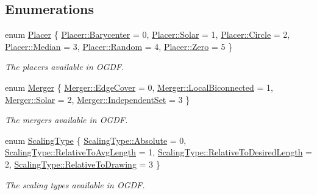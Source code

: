 \subsection*{Enumerations}
\begin{DoxyCompactItemize}
\item 
enum \hyperlink{layout_8hh_a93e50260439be3f5fe75b271c0ce2c96}{Placer} \{ \newline
\hyperlink{layout_8hh_a93e50260439be3f5fe75b271c0ce2c96abbbb1a06b3b22c3ccc5648b57aef0e87}{Placer\+::\+Barycenter} = 0, 
\hyperlink{layout_8hh_a93e50260439be3f5fe75b271c0ce2c96a352ccd39c4ed093da3690db82cca8ca0}{Placer\+::\+Solar} = 1, 
\hyperlink{layout_8hh_a93e50260439be3f5fe75b271c0ce2c96a30954d90085f6eaaf5817917fc5fecb3}{Placer\+::\+Circle} = 2, 
\hyperlink{layout_8hh_a93e50260439be3f5fe75b271c0ce2c96a66851a3adec6655a7bd563743e4a55a2}{Placer\+::\+Median} = 3, 
\newline
\hyperlink{layout_8hh_a93e50260439be3f5fe75b271c0ce2c96a64663f4646781c9c0110838b905daa23}{Placer\+::\+Random} = 4, 
\hyperlink{layout_8hh_a93e50260439be3f5fe75b271c0ce2c96ad7ed4ee1df437474d005188535f74875}{Placer\+::\+Zero} = 5
 \}\begin{DoxyCompactList}\small\item\em The placers available in O\+G\+DF. \end{DoxyCompactList}
\item 
enum \hyperlink{layout_8hh_a87e3986b1a6733e81a1c0b4bbd6aba18}{Merger} \{ \hyperlink{layout_8hh_a87e3986b1a6733e81a1c0b4bbd6aba18a63dbd8d091f1e5944a41cf67c314cbd5}{Merger\+::\+Edge\+Cover} = 0, 
\hyperlink{layout_8hh_a87e3986b1a6733e81a1c0b4bbd6aba18a18f7761401e380de1934a428c869b056}{Merger\+::\+Local\+Biconnected} = 1, 
\hyperlink{layout_8hh_a87e3986b1a6733e81a1c0b4bbd6aba18a352ccd39c4ed093da3690db82cca8ca0}{Merger\+::\+Solar} = 2, 
\hyperlink{layout_8hh_a87e3986b1a6733e81a1c0b4bbd6aba18a8b4d6dc43f32b455d6f6aeb880d12e0e}{Merger\+::\+Independent\+Set} = 3
 \}\begin{DoxyCompactList}\small\item\em The mergers available in O\+G\+DF. \end{DoxyCompactList}
\item 
enum \hyperlink{layout_8hh_ae327227c361ab0e868a1f25017cb3ae2}{Scaling\+Type} \{ \hyperlink{layout_8hh_ae327227c361ab0e868a1f25017cb3ae2ab51ca26c6c89cfc9bec338f7a0d3e0c8}{Scaling\+Type\+::\+Absolute} = 0, 
\hyperlink{layout_8hh_ae327227c361ab0e868a1f25017cb3ae2a50457e66866f1b7c064de1aed711b13a}{Scaling\+Type\+::\+Relative\+To\+Avg\+Length} = 1, 
\hyperlink{layout_8hh_ae327227c361ab0e868a1f25017cb3ae2a51099521cc62379bc5d5c9f3be2251c8}{Scaling\+Type\+::\+Relative\+To\+Desired\+Length} = 2, 
\hyperlink{layout_8hh_ae327227c361ab0e868a1f25017cb3ae2a346e055683129bfd0b982970828ab90e}{Scaling\+Type\+::\+Relative\+To\+Drawing} = 3
 \}\begin{DoxyCompactList}\small\item\em The scaling types available in O\+G\+DF. \end{DoxyCompactList}
\end{DoxyCompactItemize}
